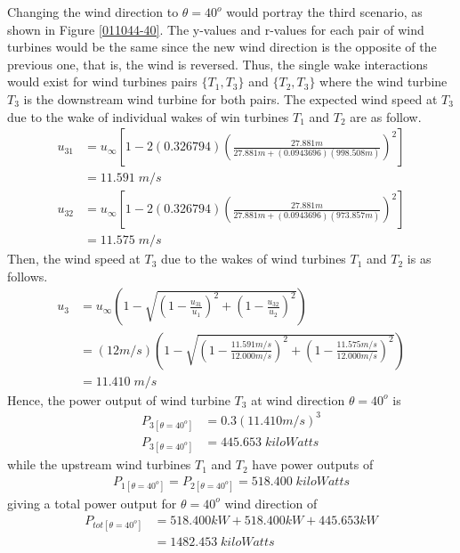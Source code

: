     Changing the wind direction to $\theta=40^o$ would portray the third scenario, as shown in Figure \ref{011044-40}. The y-values and r-values for each pair of wind turbines would be the same since the new wind direction is the opposite of the previous one, that is, the wind is reversed. Thus, the single wake interactions would exist for wind turbines pairs $\{T_1,T_3\}$ and $\{T_2,T_3\}$ where the wind turbine $T_3$ is the downstream wind turbine for both pairs. The expected wind speed at $T_3$ due to the wake of individual wakes of win turbines $T_1$ and $T_2$ are as follow.
    \begin{align*}
        u_{31} &= u_\infty \left[ 1-2(0.326794)\left( \frac{27.881m}{27.881m+(0.0943696) (998.508m)} \right)^2 \right] \\
        &=11.591\;m/s
    \end{align*}
    \begin{align*}
        u_{32} &= u_\infty \left[ 1-2(0.326794)\left( \frac{27.881m}{27.881m+(0.0943696) (973.857m)} \right)^2 \right] \\
        &=11.575\;m/s
    \end{align*}
    Then, the wind speed at $T_3$ due to the wakes of wind turbines $T_1$ and $T_2$ is as follows.
    \begin{align*}
        u_3 &= u_\infty\left( 1-\sqrt{\left( 1-\frac{u_{31}}{u_1} \right)^2 + \left( 1-\frac{u_{32}}{u_2} \right)^2} \right) \\
        &= (12m/s)\left( 1-\sqrt{\left( 1-\frac{11.591m/s}{12.000m/s} \right)^2 + \left( 1-\frac{11.575m/s}{12.000m/s} \right)^2} \right) \\
        &= 11.410\;m/s
    \end{align*}
    Hence, the power output of wind turbine $T_3$ at wind direction $\theta=40^o$ is
    \begin{align*}
        P_{3[\theta=40^o]} &= 0.3(11.410m/s)^3 \\
        P_{3[\theta=40^o]} &= 445.653\;kiloWatts
    \end{align*}
    while the upstream wind turbines $T_1$ and $T_2$ have power outputs of
    \begin{align*}
        P_{1[\theta=40^o]}=P_{2[\theta=40^o]} = 518.400\;kiloWatts
    \end{align*}
   giving a total power output for $\theta=40^o$ wind direction of
	\begin{align*}
		P_{tot[\theta=40^o]} &= 518.400kW + 518.400kW + 445.653kW \\
		&=1482.453\;kiloWatts
	\end{align*}
	

